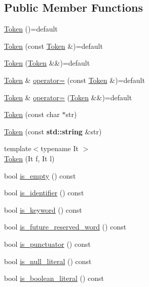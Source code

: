 \subsection*{Public Member Functions}
\begin{DoxyCompactItemize}
\item 
\hyperlink{class_token_a761bf97d165988a4250dc26500d36f89}{Token} ()=default
\item 
\hyperlink{class_token_a350ebd7ea16caa846b858ecdb1c273c6}{Token} (const \hyperlink{class_token}{Token} \&)=default
\item 
\hyperlink{class_token_afc9d412fe95cc74013031eb46eb5d924}{Token} (\hyperlink{class_token}{Token} \&\&)=default
\item 
\hyperlink{class_token}{Token} \& \hyperlink{class_token_a302f8febd87a9cca349ba76dfd782548}{operator=} (const \hyperlink{class_token}{Token} \&)=default
\item 
\hyperlink{class_token}{Token} \& \hyperlink{class_token_a4f45441b8d2dfe881c448377d4ca2cd4}{operator=} (\hyperlink{class_token}{Token} \&\&)=default
\item 
\hyperlink{class_token_a14690319b7df185a3899d4b2aedb59dc}{Token} (const char $\ast$str)
\item 
\hyperlink{class_token_a213c87418a6ff6375ab2298ee93acf43}{Token} (const \textbf{ std\+::string} \&str)
\item 
{\footnotesize template$<$typename It $>$ }\\\hyperlink{class_token_a3b8654007e4cd9b3074dbe8300cf67bf}{Token} (It f, It l)
\item 
bool \hyperlink{class_token_aaebab1fc38280c1e7714254916495103}{is\+\_\+empty} () const
\item 
bool \hyperlink{class_token_a3099586a66bb18eafee512ba32f3b75d}{is\+\_\+identifier} () const
\item 
bool \hyperlink{class_token_a73de586a62c6a20442a3d5218f248056}{is\+\_\+keyword} () const
\item 
bool \hyperlink{class_token_a3744fa3b281fc78d02eae4174119b93d}{is\+\_\+future\+\_\+reserved\+\_\+word} () const
\item 
bool \hyperlink{class_token_a9c6bbf326f7cec9fef706afe7ae018ad}{is\+\_\+punctuator} () const
\item 
bool \hyperlink{class_token_a164aae8af0eb44720bd198169349c5c6}{is\+\_\+null\+\_\+literal} () const
\item 
bool \hyperlink{class_token_a4a628c34f5ac213787a74b19a5d862d9}{is\+\_\+boolean\+\_\+literal} () const

\end{DoxyCompactItemize}
